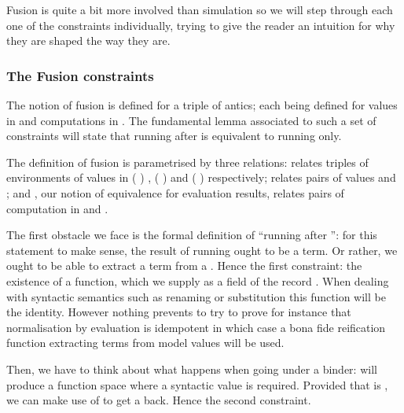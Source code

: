 Fusion is quite a bit more involved than simulation so we will step through
each one of the constraints individually, trying to give the reader an intuition
for why they are shaped the way they are.

\subsubsection{The Fusion constraints}

The notion of fusion is defined for a triple of antics; each 
being defined for values in  and computations in . The
fundamental lemma associated to such a set of constraints will state that
running  after  is equivalent to running  only.

The definition of fusion is parametrised by three relations:  relates
triples of environments of values in {(\AB{$\Gamma$} )  \AB{$\Delta$}},
{(\AB{$\Delta$} )  \AB{$\Theta$}} and {(\AB{$\Gamma$} )  \AB{$\Theta$}}
respectively;  relates pairs of values and ;
and , our notion of equivalence for evaluation results, relates pairs
of computation in  and .


The first obstacle we face is the formal definition of ``running 
after '': for this statement to make sense, the result of running
 ought to be a term. Or rather, we ought to be able to extract a
term from a . Hence the first constraint: the existence of a 
function, which we supply as a field of the record . When dealing with syntactic semantics such as renaming or substitution
this function will be the identity. However nothing prevents to try to prove for
instance that normalisation by evaluation is idempotent in which case a bona fide
reification function extracting terms from model values will be used.


Then, we have to think about what happens when going under a binder: 
will produce a  function space where a syntactic
value is required. Provided that  is , we can make use of 
to get a  back. Hence the second constraint.

